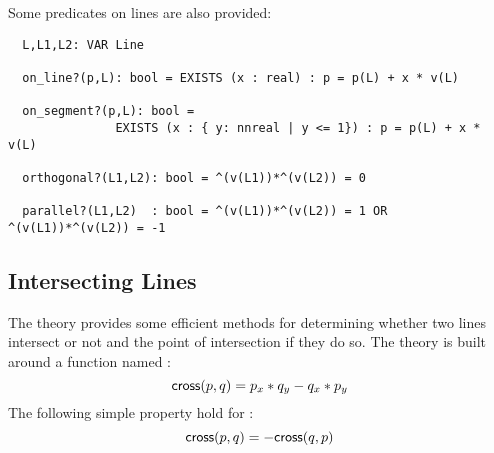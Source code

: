 \documentclass[12pt]{article}
\begin{document}
Some predicates on lines are also provided:
\begin{verbatim}
  L,L1,L2: VAR Line

  on_line?(p,L): bool = EXISTS (x : real) : p = p(L) + x * v(L)

  on_segment?(p,L): bool =
               EXISTS (x : { y: nnreal | y <= 1}) : p = p(L) + x * v(L)

  orthogonal?(L1,L2): bool = ^(v(L1))*^(v(L2)) = 0 

  parallel?(L1,L2)  : bool = ^(v(L1))*^(v(L2)) = 1 OR ^(v(L1))*^(v(L2)) = -1 
\end{verbatim}

\subsection{Intersecting Lines}

The theory  provides some efficient
methods for determining whether two lines intersect or not and the 
point of intersection if they do so.  The theory is built around
a function named : 
\[
   {\sf cross}(p,q) = p_x*q_y - q_x*p_y
\]
The following simple property hold for :  
\[
   {\sf cross}(p,q) = -{\sf cross}(q,p)
\]
\end{document}
